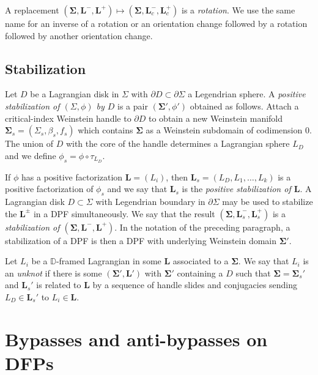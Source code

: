 \documentclass[11pt]{amsart}
\newcommand{\thicc}[1]{\pmb{#1}}
\newcommand{\disk}{\mathbb{D}}
\newcommand{\LagTuple}{\thicc{L}}
\begin{document}
A replacement $(\thicc{\Sigma}, \LagTuple^{-}, \LagTuple^{+}) \mapsto (\thicc{\Sigma}, \LagTuple^{-}_{c}, \LagTuple^{+}_{c})$ is a \emph{rotation}. We use the same name for an inverse of a rotation or an orientation change followed by a rotation followed by another orientation change.

\subsection{Stabilization}

Let $D$ be a Lagrangian disk in $\Sigma$ with $\partial D \subset \partial \Sigma$ a Legendrian sphere. A \emph{positive stabilization of $(\Sigma, \phi)$ by $D$} is a pair $(\thicc{\Sigma}', \phi')$ obtained as follows. Attach a critical-index Weinstein handle to $\partial D$ to obtain a new Weinstein manifold $\thicc{\Sigma}_{s} =(\Sigma_{s}, \beta_{s}, f_{s})$ which contains $\thicc{\Sigma}$ as a Weinstein subdomain of codimension $0$. The union of $D$ with the core of the handle determines a Lagrangian sphere $L_{D}$ and we define $\phi_{s} = \phi \circ \tau_{L_{D}}$.

If $\phi$ has a positive factorization $\LagTuple = (L_{i})$, then $\LagTuple_{s} = (L_{D}, L_{1}, \dots, L_{k})$ is a positive factorization of $\phi_{s}$ and we say that $\LagTuple_{s}$ is the \emph{positive stabilization of $\LagTuple$}. A Lagrangian disk $D \subset \Sigma$ with Legendrian boundary in $\partial \Sigma$ may be used to stabilize the $\LagTuple^{\pm}$ in a DPF simultaneously. We say that the result $(\thicc{\Sigma}, \LagTuple^{-}_{s}, \LagTuple^{+}_{s})$ is a \emph{stabilization of $(\thicc{\Sigma}, \LagTuple^{-}, \LagTuple^{+})$}. In the notation of the preceding paragraph, a stabilization of a DPF is then a DPF with underlying Weinstein domain $\thicc{\Sigma}'$.

Let $L_{i}$ be a $\disk$-framed Lagrangian in some $\LagTuple$ associated to a $\thicc{\Sigma}$. We say that $L_{i}$ is an \emph{unknot} if there is some $(\thicc{\Sigma}', \LagTuple')$ with $\thicc{\Sigma}'$ containing a $D$ such that $\thicc{\Sigma} = \thicc{\Sigma}_{s}'$ and $\LagTuple_{s}'$ is related to $\LagTuple$ by a sequence of handle slides and conjugacies sending $L_{D} \in \LagTuple_{s}'$ to $L_{i} \in \LagTuple$.

\section{Bypasses and anti-bypasses on DFPs}\label{Sec:BypassAntiBypass}
\end{document}
